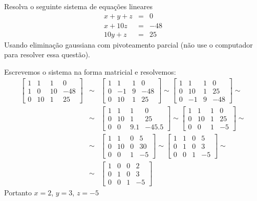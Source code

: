 \begin{Exercise}\label{prob_gausspp} Resolva o seguinte sistema de equações lineares
\begin{eqnarray*}
x+y+z&=&0\\
x+10z&=&-48\\
10y+z&=&25
\end{eqnarray*} Usando eliminação gaussiana com pivoteamento parcial (não use o computador para resolver essa questão).
\end{Exercise}
\begin{Answer}
  \begin{tiny}
Escrevemos o sistema na forma matricial e resolvemos:
\begin{eqnarray*}
\left[
\begin{array}{ccc|c}
1&1&1&0\\
1&0&10&-48\\
0&10&1&25
\end{array}\right] &\sim&
\left[
\begin{array}{ccc|c}
1&1&1&0\\
0&-1&9&-48\\
0&10&1&25
\end{array}\right] \sim
\left[
\begin{array}{ccc|c}
1&1&1&0\\
0&10&1&25\\
0&-1&9&-48
\end{array}\right]\sim\\
&\sim&\left[
\begin{array}{ccc|c}
1&1&1&0\\
0&10&1&25\\
0&0&9.1&-45.5
\end{array}\right]\sim
\left[
\begin{array}{ccc|c}
1&1&1&0\\
0&10&1&25\\
0&0&1&-5
\end{array}\right]\sim\\
&\sim&\left[
\begin{array}{ccc|c}
1&1&0&5\\
0&10&0&30\\
0&0&1&-5
\end{array}\right]
\sim\left[
\begin{array}{ccc|c}
1&1&0&5\\
0&1&0&3\\
0&0&1&-5
\end{array}\right]\sim\\
&\sim&\left[
\begin{array}{ccc|c}
1&0&0&2\\
0&1&0&3\\
0&0&1&-5
\end{array}\right]
\end{eqnarray*}
Portanto $x=2$, $y=3$, $z=-5$
      \end{tiny}
\end{Answer}

